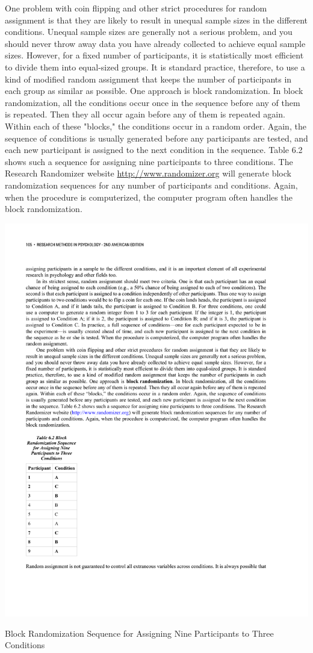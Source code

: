 One problem with coin flipping and other strict procedures for random assignment is that they are likely to result in unequal sample sizes in the different conditions. Unequal sample sizes are generally not a serious problem, and you should never throw away data you have already collected to achieve equal sample sizes. However, for a fixed number of participants, it is statistically most efficient to divide them into equal-sized groups. It is standard practice, therefore, to use a kind of modified random assignment that keeps the number of participants in each group as similar as possible. One approach is block randomization. In block randomization, all the conditions occur once in the sequence before any of them is repeated. Then they all occur again before any of them is repeated again. Within each of these "blocks," the conditions occur in a random order. Again, the sequence of conditions is usually generated before any participants are tested, and each new participant is assigned to the next condition in the sequence. Table 6.2 shows such a sequence for assigning nine participants to three conditions. The Research Randomizer website \url{http://www.randomizer.org} will generate block randomization sequences for any number of participants and conditions. Again, when the procedure is computerized, the computer program often handles the block randomization.
\begin{marginfigure}[0in]
       \includegraphics[width=\linewidth]{figures/C6blockRandomization.pdf}
       \caption{Block Randomization Sequence for Assigning Nine Participants to Three Conditions}
       \label{fig:Bargraph}
 \end{marginfigure}

